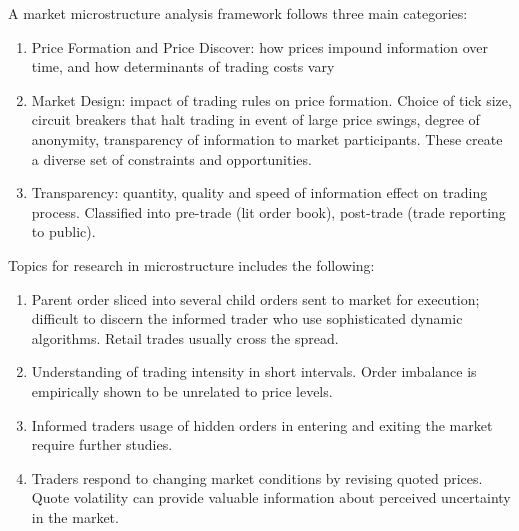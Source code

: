 A market microstructure analysis framework follows three main categories:
\begin{enumerate}[label=\roman*.]
\setlength{\itemsep}{0pt}
\item Price Formation and Price Discover: how prices impound information over time, and how determinants of trading costs vary
\item Market Design: impact of trading rules on price formation. Choice of tick size, circuit breakers that halt trading in event of large price swings, degree of anonymity, transparency of information to market participants. These create a diverse set of constraints and opportunities.
\item Transparency: quantity, quality and speed of information effect on trading process. Classified into pre-trade (lit order book), post-trade (trade reporting to public). 
\end{enumerate}

Topics for research in microstructure includes the following:
\begin{enumerate}[label=\roman*.]
\setlength{\itemsep}{0pt}
\item Parent order sliced into several child orders sent to market for execution; difficult to discern the informed trader who use sophisticated dynamic algorithms. Retail trades usually cross the spread.
\item Understanding of trading intensity in short intervals. Order imbalance is empirically shown to be unrelated to price levels.
\item Informed traders usage of hidden orders in entering and exiting the market require further studies.
\item Traders respond to changing market conditions by revising quoted prices. Quote volatility can provide valuable information about perceived uncertainty in the market.
\end{enumerate}
